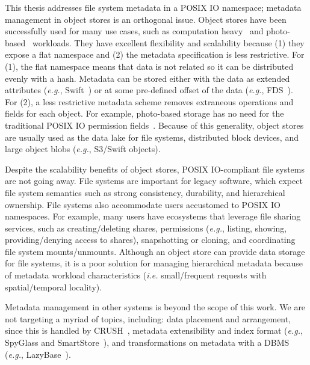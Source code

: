 This thesis addresses file system metadata in a POSIX IO namespace; metadata
management in object stores is an orthogonal issue.  Object stores have been
successfully used for many use cases, such as computation
heavy~\cite{nightingale:osdi2012-fds} and
photo-based~\cite{beaver:osdi2010-haystack} workloads.  They have excellent
flexibility and scalability because (1) they expose a flat namespace and (2)
the metadata specification is less restrictive. For (1), the flat namespace
means that data is not related so it can be distributed evenly with a hash.
Metadata can be stored either with the data as extended attributes ({\it e.g.},
Swift~\cite{toor:nas2012-swift}) or at some pre-defined offset of the data
({\it e.g.}, FDS~\cite{nightingale:osdi2012-fds}). For (2), a less restrictive
metadata scheme removes extraneous operations and fields for each object. For
example, photo-based storage has no need for the traditional POSIX IO
permission fields~\cite{beaver:osdi2010-haystack}. Because of this generality,
object stores are usually used as the data lake for file systems, distributed
block devices, and large object blobs ({\it e.g.}, S3/Swift objects).

Despite the scalability benefits of object stores, POSIX IO-compliant file
systems are not going away. File systems are important for legacy software,
which expect file system semantics such as strong consistency, durability, and
hierarchical ownership.  File systems also accommodate users accustomed to
POSIX IO namespaces. For example, many users have ecosystems that leverage file
sharing services, such as creating/deleting shares, permissions ({\it e.g.},
listing, showing, providing/denying access to shares), snapshotting or
cloning, and coordinating file system mounts/unmounts.  Although an object
store can provide data storage for file systems, it is a poor solution for
managing hierarchical metadata because of metadata workload characteristics
({\it i.e.} small/frequent requests with spatial/temporal locality).

Metadata management in other systems is beyond the scope of this work. We are
not targeting a myriad of topics, including: data placement and arrangement,
since this is handled by CRUSH~\cite{weil:osdi2006-ceph}, metadata
extensibility and index format ({\it e.g.}, SpyGlass\cite{leung:fast2009-spyglass} and
SmartStore~\cite{hua:sc2009-smartstore}), and transformations on metadata with
a DBMS ({\it e.g.}, LazyBase~\cite{cipar:eurosys2012-lazybase}). 




